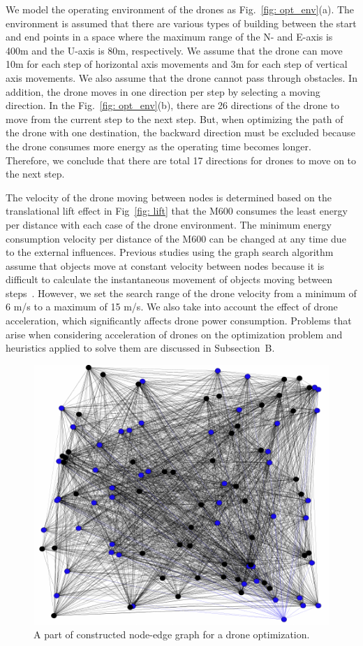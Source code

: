\documentclass[journal]{./template/IEEEtran}
\begin{document}
We model the operating environment of the drones as Fig.~\ref{fig: opt_env}(a).
The environment is assumed that there are various types of building between the start and end points in a space where the maximum range of the N- and E-axis is 400m and the U-axis is 80m, respectively.
We assume that the drone can move 10m for each step of horizontal axis movements and 3m for each step of vertical axis movements. We also assume that the drone cannot pass through obstacles. In addition, the drone moves in one direction per step by selecting a moving direction.
In the Fig.~\ref{fig: opt_env}(b), there are 26 directions of the drone to move from the current step to the next step.
But, when optimizing the path of the drone with one destination, the backward direction must be excluded because the drone consumes more energy as the operating time becomes longer. Therefore, we conclude that there are total 17 directions for drones to move on to the next step.

The velocity of the drone moving between nodes is determined based on the translational lift effect in Fig~\ref{fig: lift} that the M600 consumes the least energy per distance with each case of the drone environment. 
The minimum energy consumption velocity per distance of the M600 can be changed at any time due to the external influences.  
Previous studies using the graph search algorithm assume that objects move at constant velocity between nodes because it is difficult to calculate the instantaneous movement of objects moving between steps~\cite{ref_8, ref_10, ref_22}. 
However, we set the search range of the drone velocity from a minimum of 6 m/s to a maximum of 15 m/s. We also take into account the effect of drone acceleration, which significantly affects drone power consumption.
Problems that arise when considering acceleration of drones on the optimization problem and heuristics applied to solve them are discussed in Subsection~B.

\begin{figure}[htbp]
\centering\includegraphics[scale=0.85]{fig12/Node_graph.pdf}
\caption{A part of constructed node-edge graph for a drone optimization.}
\label{fig:node_graph}
\end{figure}
\end{document}
